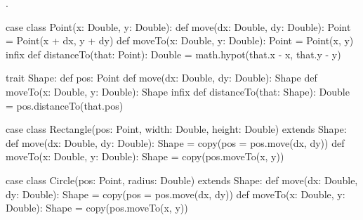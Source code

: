 \SubtaskSolved {}.

\SubtaskSolved  
\begin{CodeSmall}
case class Point(x: Double, y: Double):
  def move(dx: Double, dy: Double): Point = Point(x + dx, y + dy)
  def moveTo(x: Double, y: Double): Point = Point(x, y)
  infix def distanceTo(that: Point): Double = math.hypot(that.x - x, that.y - y)

trait Shape:
  def pos: Point
  def move(dx: Double, dy: Double): Shape
  def moveTo(x: Double, y: Double): Shape
  infix def distanceTo(that: Shape): Double = pos.distanceTo(that.pos)

case class Rectangle(pos: Point, width: Double, height: Double) extends Shape:
  def move(dx: Double, dy: Double): Shape = copy(pos = pos.move(dx, dy))
  def moveTo(x: Double, y: Double): Shape = copy(pos.moveTo(x, y))

case class Circle(pos: Point, radius: Double) extends Shape:
  def move(dx: Double, dy: Double): Shape = copy(pos = pos.move(dx, dy))
  def moveTo(x: Double, y: Double): Shape = copy(pos.moveTo(x, y))
\end{CodeSmall}

\QUESTEND












